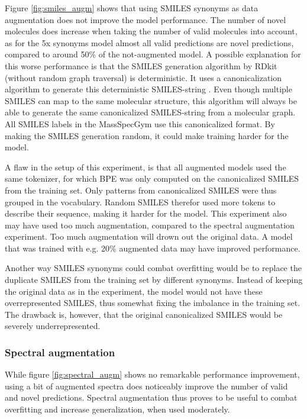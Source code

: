 Figure \ref{fig:smiles_augm} shows that using SMILES synonyms as data augmentation does not improve the model performance.
The number of novel molecules does increase when taking the number of valid molecules into account, as for the 5x synonyms model almost all valid predictions are novel predictions, compared to around 50\% of the not-augmented model.
A possible explanation for this worse performance is that the SMILES generation algorithm by RDkit (without random graph traversal) is deterministic.
It uses a canonicalization algorithm to generate this deterministic SMILES-string \cite{daylight_smiles_theory}.
Even though multiple SMILES can map to the same molecular structure, this algorithm will always be able to generate the same canonicalized SMILES-string from a molecular graph.
All SMILES labels in the MassSpecGym use this canonicalized format. 
By making the SMILES generation random, it could make training harder for the model.

A flaw in the setup of this experiment, is that all augmented models used the same tokenizer, for which \ac{BPE} was only computed on the canonicalized SMILES from the training set.
Only patterns from canonicalized SMILES were thus grouped in the vocabulary.
Random SMILES therefor used more tokens to describe their sequence, making it harder for the model.
This experiment also may have used too much augmentation, compared to the spectral augmentation experiment.
Too much augmentation will drown out the original data.
A model that was trained with e.g. 20\% augmented data may have improved performance.

Another way SMILES synonyms could combat overfitting would be to replace the duplicate SMILES from the training set by different synonyms.
Instead of keeping the original data as in the experiment, the model would not have these overrepresented SMILES, thus somewhat fixing the imbalance in the training set.
The drawback is, however, that the original canonicalized SMILES would be severely underrepresented.

\subsubsection*{Spectral augmentation}

While figure \ref{fig:spectral_augm} shows no remarkable performance improvement, using a bit of augmented spectra does noticeably improve the number of valid and novel predictions.
Spectral augmentation thus proves to be useful to combat overfitting and increase generalization, when used moderately.

